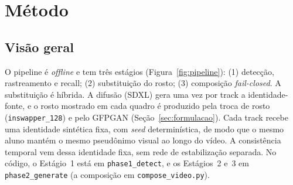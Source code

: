 \chapter{Método}
\label{cap:metodo}


\section{Visão geral}

O pipeline é \emph{offline} e tem três estágios (Figura~\ref{fig:pipeline}): (1) detecção, rastreamento e recall; (2) substituição do rosto; (3) composição \emph{fail-closed}. A substituição é híbrida. A difusão (SDXL) gera uma vez por track a identidade-fonte, e o rosto mostrado em cada quadro é produzido pela troca de rosto (\texttt{inswapper\_128}) e pelo GFPGAN (Seção~\ref{sec:formulacao}). Cada track recebe uma identidade sintética fixa, com \emph{seed} determinística, de modo que o mesmo aluno mantém o mesmo pseudônimo visual ao longo do vídeo. A consistência temporal vem dessa identidade fixa, sem rede de estabilização separada. No código, o Estágio~1 está em \texttt{phase1\_detect}, e os Estágios~2 e~3 em \texttt{phase2\_generate} (a composição em \texttt{compose\_video.py}).


